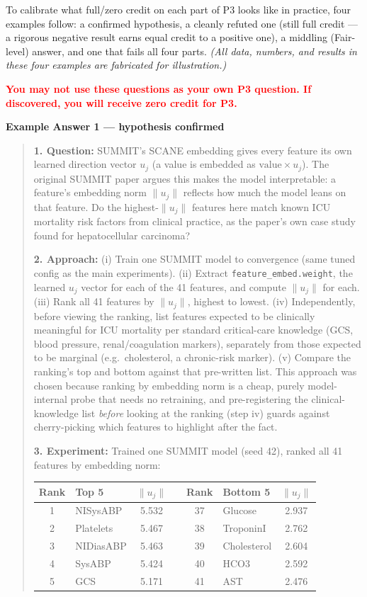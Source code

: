 \documentclass{article}
\begin{document}
To calibrate what full/zero credit on each part of P3 looks like in practice, four examples follow: a confirmed hypothesis, a cleanly refuted one (still full credit --- a rigorous negative result earns equal credit to a positive one), a middling (Fair-level) answer, and one that fails all four parts. \emph{(All data, numbers, and results in these four examples are fabricated for illustration.)}

\textcolor{red}{\textbf{You may not use these questions as your own P3 question. If discovered, you will receive zero credit for P3.}}

\bigskip
\noindent\textbf{Example Answer 1 --- hypothesis confirmed}

\begin{quote}
\textbf{1. Question:} SUMMIT's SCANE embedding gives every feature its own learned direction vector $u_j$ (a value is embedded as $\text{value} \times u_j$). The original SUMMIT paper argues this makes the model interpretable: a feature's embedding norm $\|u_j\|$ reflects how much the model leans on that feature. Do the highest-$\|u_j\|$ features here match known ICU mortality risk factors from clinical practice, as the paper's own case study found for hepatocellular carcinoma?

\textbf{2. Approach:}
(i) Train one SUMMIT model to convergence (same tuned config as the main experiments).
(ii) Extract \texttt{feature\_embed.weight}, the learned $u_j$ vector for each of the 41 features, and compute $\|u_j\|$ for each.
(iii) Rank all 41 features by $\|u_j\|$, highest to lowest.
(iv) Independently, before viewing the ranking, list features expected to be clinically meaningful for ICU mortality per standard critical-care knowledge (GCS, blood pressure, renal/coagulation markers), separately from those expected to be marginal (e.g.\ cholesterol, a chronic-risk marker).
(v) Compare the ranking's top and bottom against that pre-written list.
This approach was chosen because ranking by embedding norm is a cheap, purely model-internal probe that needs no retraining, and pre-registering the clinical-knowledge list \emph{before} looking at the ranking (step iv) guards against cherry-picking which features to highlight after the fact.

\textbf{3. Experiment:} Trained one SUMMIT model (seed 42), ranked all 41 features by embedding norm:

\begin{center}
\begin{tabular}{clc c clc}
\hline
Rank & Top 5 & $\|u_j\|$ & & Rank & Bottom 5 & $\|u_j\|$ \\
\hline
1 & NISysABP & 5.532 & & 37 & Glucose & 2.937 \\
2 & Platelets & 5.467 & & 38 & TroponinI & 2.762 \\
3 & NIDiasABP & 5.463 & & 39 & Cholesterol & 2.604 \\
4 & SysABP & 5.424 & & 40 & HCO3 & 2.592 \\
5 & GCS & 5.171 & & 41 & AST & 2.476 \\
\hline
\end{tabular}
\end{center}


\end{quote}
\end{document}
